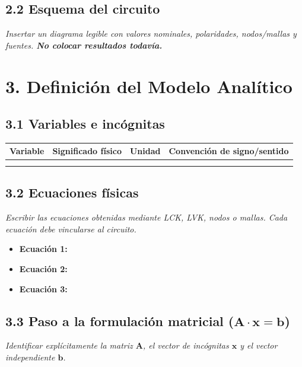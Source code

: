 \documentclass[11pt, a4paper]{article}
\begin{document}
\subsection*{2.2 Esquema del circuito}
\textit{Insertar un diagrama legible con valores nominales, polaridades, nodos/mallas y fuentes. \textbf{No colocar resultados todavía.}}
\vspace{4cm} %

\section*{3. Definición del Modelo Analítico}
\subsection*{3.1 Variables e incógnitas}
\renewcommand{\arraystretch}{1.5}
\begin{tabularx}{\linewidth}{@{}|l|X|l|X|@{}}
    \hline
    \textbf{Variable} & \textbf{Significado físico} & \textbf{Unidad} & \textbf{Convención de signo/sentido} \\
    \hline
    & & & \\
    \hline
    & & & \\
    \hline
\end{tabularx}

\subsection*{3.2 Ecuaciones físicas}
\textit{Escribir las ecuaciones obtenidas mediante LCK, LVK, nodos o mallas. Cada ecuación debe vincularse al circuito.}
\begin{itemize}[itemsep=6pt]
    \item \textbf{Ecuación 1:} \hrulefill
    \item \textbf{Ecuación 2:} \hrulefill
    \item \textbf{Ecuación 3:} \hrulefill
\end{itemize}

\subsection*{3.3 Paso a la formulación matricial ($\mathbf{A} \cdot \mathbf{x} = \mathbf{b}$)}
\textit{Identificar explícitamente la matriz $\mathbf{A}$, el vector de incógnitas $\mathbf{x}$ y el vector independiente $\mathbf{b}$.}
\vspace{2cm} %
\end{document}
